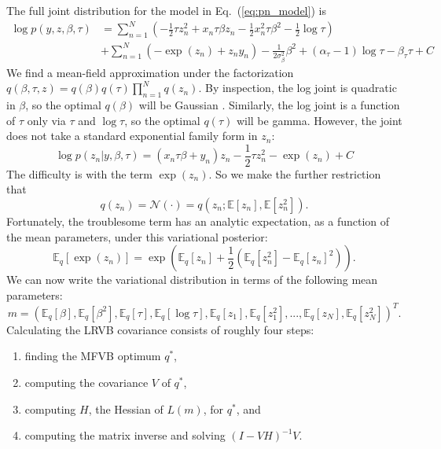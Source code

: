 \documentclass{article}\usepackage[]{graphicx}\usepackage[]{color}
\newcommand{\eq}[1]{Eq.~(\ref{eq:#1})}
\newcommand{\gauss}{\mathcal{N}} %
\newcommand{\vbcov}{V} %
\newcommand{\constant}{C} %
\newcommand{\mbe}{\mathbb{E}}
\newcommand{\mbeq}{\mathbb{E}_{q}}
\begin{document}
The full joint distribution for the model in \eq{pn_model} is
%
\begin{align*}
\log p\left(y,z,\beta,\tau\right) &= \sum_{n=1}^{N}\left(-\frac{1}{2}\tau z_{n}^{2}+x_{n}\tau\beta z_{n}-\frac{1}{2}x_{n}^{2}\tau\beta^{2}-\frac{1}{2}\log\tau\right)\\
 &+\sum_{n=1}^{N}\left(-\exp\left(z_{n}\right)+z_{n}y_{n}\right)
 -\frac{1}{2\sigma_{\beta}^{2}}\beta^{2}+\left(\alpha_{\tau}-1\right)\log\tau-\beta_{\tau}\tau+\constant
\end{align*}
%
We find a mean-field approximation under the factorization
$q\left(\beta,\tau,z\right) =
q\left(\beta\right)q\left(\tau\right)\prod_{n=1}^{N}q\left(z_{n}\right)$. By
inspection, the log joint is quadratic in $\beta$, so the optimal
$q\left(\beta\right)$ will be Gaussian \citep{bishop:2006:pattern}. Similarly, the
log joint is a function of $\tau$ only via $\tau$ and $\log\tau$, so the optimal
$q\left(\tau\right)$ will be gamma. However, the joint does not take a standard
exponential family form in $z_n$:
%
$$
  \log p\left(z_{n}\vert y,\beta,\tau\right) = \left(x_{n}\tau\beta+y_{n}\right)z_{n}-\frac{1}{2}\tau z_{n}^{2}-\exp\left(z_{n}\right)+\constant
$$
%
The difficulty is with the term $\exp\left(z_{n}\right)$. So we make the further
restriction that
%
$$
  q\left(z_{n}\right) = \gauss\left(\cdot\right)=q\left(z_{n};\mbe\left[z_{n}\right],\mbe\left[z_{n}^{2}\right]\right).
$$
%
Fortunately, the troublesome term has an analytic expectation, as
a function of the mean parameters, under this variational posterior:
%
$$
  \mbeq\left[\exp\left(z_{n}\right)\right] = \exp\left(\mbeq\left[z_{n}\right]+\frac{1}{2}\left(\mbeq\left[z_{n}^{2}\right]-\mbeq\left[z_{n}\right]^{2}\right)\right).
$$
%
We can now write the variational distribution in terms of the following
mean parameters:
%
$$
  m = \left(\mbeq\left[\beta\right],\mbeq\left[\beta^{2}\right],\mbeq\left[\tau\right],\mbeq\left[\log\tau\right],\mbeq\left[z_{1}\right],\mbeq\left[z_{1}^{2}\right],...,\mbeq\left[z_{N}\right],\mbeq\left[z_{N}^{2}\right]\right)^{T}.
$$
%
Calculating the LRVB covariance consists of roughly four steps:

\begin{enumerate}
\item finding the MFVB optimum $q^{*}$,
\item computing the covariance $\vbcov$ of $q^*$,
\item computing $H$, the Hessian of $L(m)$, for $q^*$, and
\item computing the matrix inverse and solving $\left(I-VH\right)^{-1}V$.
\end{enumerate}
\end{document}
